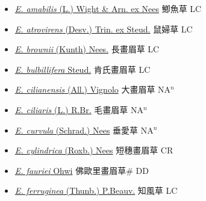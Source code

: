 \begin{itemize}
  \begin{itemize}
        \item[] \href{http://www.theplantlist.org/tpl1.1/search?q=Eragrostis+amabilis}{\textit{E. amabilis} (L.) Wight \& Arn. ex Nees}   鯽魚草 LC
        \item[] \href{http://www.theplantlist.org/tpl1.1/search?q=Eragrostis+atrovirens}{\textit{E. atrovirens} (Desv.) Trin. ex Steud.}   鼠婦草 LC
        \item[] \href{http://www.theplantlist.org/tpl1.1/search?q=Eragrostis+brownii}{\textit{E. brownii} (Kunth) Nees.}   長畫眉草 LC
        \item[] \href{http://www.theplantlist.org/tpl1.1/search?q=Eragrostis+bulbillifera}{\textit{E. bulbillifera} Steud.}   肯氏畫眉草 LC
        \item[] \href{http://www.theplantlist.org/tpl1.1/search?q=Eragrostis+cilianensis}{\textit{E. cilianensis} (All.) Vignolo}   大畫眉草 NA$^n$
        \item[] \href{http://www.theplantlist.org/tpl1.1/search?q=Eragrostis+ciliaris}{\textit{E. ciliaris} (L.) R.Br.}   毛畫眉草 NA$^n$
        \item[] \href{http://www.theplantlist.org/tpl1.1/search?q=Eragrostis+curvula}{\textit{E. curvula} (Schrad.) Nees}   垂愛草 NA$^n$
        \item[] \href{http://www.theplantlist.org/tpl1.1/search?q=Eragrostis+cylindrica}{\textit{E. cylindrica} (Roxb.) Nees}   短穗畫眉草 CR
        \item[] \href{http://www.theplantlist.org/tpl1.1/search?q=Eragrostis+fauriei}{\textit{E. fauriei} Ohwi}   佛歐里畫眉草\# DD
        \item[] \href{http://www.theplantlist.org/tpl1.1/search?q=Eragrostis+ferruginea}{\textit{E. ferruginea} (Thunb.) P.Beauv.}   知風草 LC

\end{itemize}
\end{itemize}
